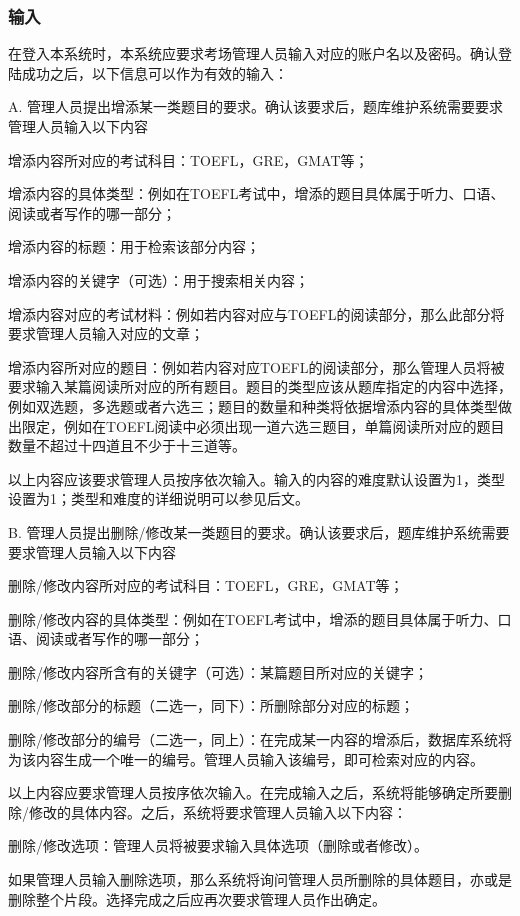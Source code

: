 \subsubsection{输入}
在登入本系统时，本系统应要求考场管理人员输入对应的账户名以及密码。确认登陆成功之后，以下信息可以作为有效的输入：

A. 管理人员提出增添某一类题目的要求。确认该要求后，题库维护系统需要要求管理人员输入以下内容

	增添内容所对应的考试科目：TOEFL，GRE，GMAT等；

	增添内容的具体类型：例如在TOEFL考试中，增添的题目具体属于听力、口语、阅读或者写作的哪一部分；

	增添内容的标题：用于检索该部分内容；

	增添内容的关键字（可选）：用于搜索相关内容；

	增添内容对应的考试材料：例如若内容对应与TOEFL的阅读部分，那么此部分将要求管理人员输入对应的文章；

	增添内容所对应的题目：例如若内容对应TOEFL的阅读部分，那么管理人员将被要求输入某篇阅读所对应的所有题目。题目的类型应该从题库指定的内容中选择，例如双选题，多选题或者六选三；题目的数量和种类将依据增添内容的具体类型做出限定，例如在TOEFL阅读中必须出现一道六选三题目，单篇阅读所对应的题目数量不超过十四道且不少于十三道等。

以上内容应该要求管理人员按序依次输入。输入的内容的难度默认设置为1，类型设置为1；类型和难度的详细说明可以参见后文。

B. 管理人员提出删除/修改某一类题目的要求。确认该要求后，题库维护系统需要要求管理人员输入以下内容

	删除/修改内容所对应的考试科目：TOEFL，GRE，GMAT等；

	删除/修改内容的具体类型：例如在TOEFL考试中，增添的题目具体属于听力、口语、阅读或者写作的哪一部分；

	删除/修改内容所含有的关键字（可选）：某篇题目所对应的关键字；

	删除/修改部分的标题（二选一，同下）：所删除部分对应的标题；

	删除/修改部分的编号（二选一，同上）：在完成某一内容的增添后，数据库系统将为该内容生成一个唯一的编号。管理人员输入该编号，即可检索对应的内容。

以上内容应要求管理人员按序依次输入。在完成输入之后，系统将能够确定所要删除/修改的具体内容。之后，系统将要求管理人员输入以下内容：

	删除/修改选项：管理人员将被要求输入具体选项（删除或者修改）。

	如果管理人员输入删除选项，那么系统将询问管理人员所删除的具体题目，亦或是删除整个片段。选择完成之后应再次要求管理人员作出确定。

